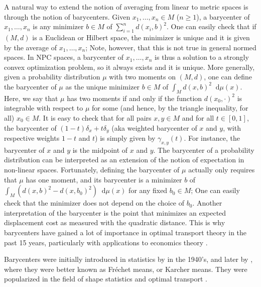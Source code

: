 \documentclass[10pt,a4paper]{article}
\theoremstyle{plain}
\theoremstyle{definition}
\theoremstyle{remark}
\newcommand*\diff{\mathop{}\!\mathrm{d}}
\begin{document}
A natural way to extend the notion of averaging from linear to metric spaces is through the notion of barycenters. Given $x_1,\ldots,x_n\in M$ ($n\geq 1$), a barycenter of $x_1,\ldots,x_n$ is any minimizer $b\in M$ of $\sum_{i=1}^{n}d(x_i,b)^2$. One can easily check that if $(M,d)$ is a Euclidean or Hilbert space, the minimizer is unique and it is given by the average of $x_1,\ldots,x_n$; Note, however, that this is not true in general normed spaces. In NPC spaces, a barycenter of $x_1,\ldots,x_n$ is thus a solution to a strongly convex optimization problem, so it always exists and it is unique. More generally, given a probability distribution $\mu$ with two moments on $(M,d)$, one can define the barycenter of $\mu$ as the unique minimizer $b\in M$ of $\int_M d(x,b)^2\diff\mu(x)$. Here, we say that $\mu$ has two moments if and only if the function $d(x_0,\cdot)^2$ is integrable with respect to $\mu$ for some (and hence, by the triangle inequality, for all) $x_0\in M$. It is easy to check that for all pairs $x,y\in M$ and for all $t\in [0,1]$, the barycenter of $(1-t)\delta_x+t\delta_y$ (aka weighted barycenter of $x$ and $y$, with respective weights $1-t$ and $t$) is simply given by $\gamma_{x,y}(t)$. For instance, the barycenter of $x$ and $y$ is the midpoint of $x$ and $y$. The barycenter of a probability distribution can be interpreted as an extension of the notion of expectation in non-linear spaces. Fortunately, defining the barycenter of $\mu$ actually only requires that $\mu$ has one moment, and its barycenter is a minimizer $b$ of $\int_M (d(x,b)^2-d(x,b_0)^2)\diff\mu(x)$ for any fixed $b_0\in M$; One can easily check that the minimizer does not depend on the choice of $b_0$. Another interpretation of the barycenter is the point that minimizes an expected displacement cost as measured with the quadratic distance. This is why barycenters have gained a lot of importance in optimal transport theory in the past 15 years, particularly with applications to economics theory \cite{agueh2011barycenters}.

Barycenters were initially introduced in statistics by \cite{Frechet48} in the 1940's, and later by \cite{karcher1977Riemannian}, where they were better known as Fréchet means, or Karcher means. They were popularized in the field of shape statistics \cite{kendall2009shape} and optimal transport \cite{agueh2011barycenters,cuturi2014fast,le2017existence,claici2018stochastic,kroshnin2019complexity,altschuler2021wasserstein,altschuler2022wasserstein}.
\end{document}
